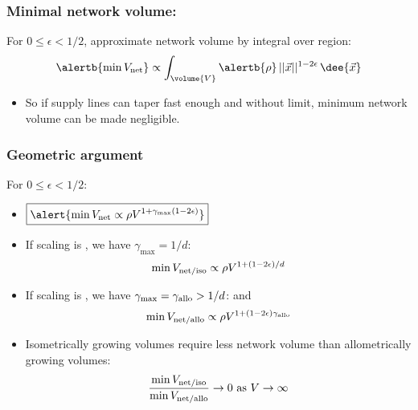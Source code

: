 \begin{frame}
  \frametitle{Minimal network volume:}

  For $0 \le \epsilon < 1/2$, approximate network volume by integral over region:
  $$ 
  \alertb{\min V_{\textnormal{net}}}  \propto 
  \int_{\volume{V}} \alertb{\rho} \, ||\vec{x}||^{1-2\epsilon} \, \dee{\vec{x}} 
  $$
  \begin{itemize}
  \item<4->
    So if supply lines can taper fast enough and without
    limit, minimum network volume can be made negligible.
  \end{itemize}
\end{frame}

\begin{frame}
  \frametitle{Geometric argument}

  \begin{block}{For $0 \le \epsilon < 1/2$:}
    \begin{itemize}
    \item<1-> 
      $
      \boxed{\alert{
          \min V_{\textnormal{net}} 
          \propto
          \rho V^{1+\gamma_{\max}(1-2\epsilon)} 
        }}
      $
    \item<2-> 
      If scaling is , we have $\gamma_{\max} = 1/d$:
      $$
      \min V_{\textnormal{net/iso}} 
      \propto
      \rho V^{1+(1-2\epsilon)/d}
      $$
    \item<3-> 
      If scaling is , we have
      $\gamma_{\max} = \gamma_{\textnormal{allo}} > 1/d$:
      and 
      $$
      \min V_{\textnormal{net/allo}} 
      \propto
      \rho V^{1+(1-2\epsilon)\gamma_{\textnormal{allo}}}
      $$
    \item<4-> 
      Isometrically growing volumes 
      \alert{require less network volume} 
      than allometrically growing volumes:
      $$
      \frac{\min V_{\textnormal{net/iso}}}{\min V_{\textnormal{net/allo}}} \rightarrow 0 
      \mbox{\ as $V \rightarrow \infty$}
      $$
    \end{itemize}    
  \end{block}
\end{frame}

